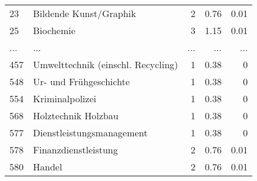 \begin{longtable}{lXrrr}
        23 & \multicolumn{1}{X}{Bildende Kunst/Graphik} & %
          \num{2} &
          \num[round-mode=places,round-precision=2]{0,76} &
          \num[round-mode=places,round-precision=2]{0,01} \\
        25 & \multicolumn{1}{X}{Biochemie} & %
          \num{3} &
          \num[round-mode=places,round-precision=2]{1,15} &
          \num[round-mode=places,round-precision=2]{0,01} \\
       ... & ... & ... & ... & ... \\
        457 & \multicolumn{1}{X}{Umwelttechnik (einschl. Recycling)} & %
          \num{1} &
          \num[round-mode=places,round-precision=2]{0,38} &
          \num[round-mode=places,round-precision=2]{0} \\

        548 & \multicolumn{1}{X}{Ur- und Frühgeschichte} & %
          \num{1} &
          \num[round-mode=places,round-precision=2]{0,38} &
          \num[round-mode=places,round-precision=2]{0} \\

        554 & \multicolumn{1}{X}{Kriminalpolizei} & %
          \num{1} &
          \num[round-mode=places,round-precision=2]{0,38} &
          \num[round-mode=places,round-precision=2]{0} \\

        568 & \multicolumn{1}{X}{Holztechnik Holzbau} & %
          \num{1} &
          \num[round-mode=places,round-precision=2]{0,38} &
          \num[round-mode=places,round-precision=2]{0} \\

        577 & \multicolumn{1}{X}{Dienstleistungsmanagement} & %
          \num{1} &
          \num[round-mode=places,round-precision=2]{0,38} &
          \num[round-mode=places,round-precision=2]{0} \\

        578 & \multicolumn{1}{X}{Finanzdienstleistung} & %
          \num{2} &
          \num[round-mode=places,round-precision=2]{0,76} &
          \num[round-mode=places,round-precision=2]{0,01} \\

        580 & \multicolumn{1}{X}{Handel} & %
          \num{2} &
          \num[round-mode=places,round-precision=2]{0,76} &
          \num[round-mode=places,round-precision=2]{0,01} \\


\end{longtable}
